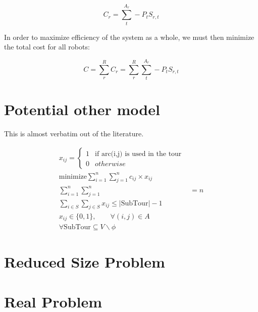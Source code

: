 \documentclass[a4paper]{article}
\begin{document}
$$C_r = \sum_t^{A_r} -P_t S_{r,t}$$

In order to maximize efficiency of the system as a whole, we must then minimize the total cost for all robots:

$$C = \sum_r^{R} C_r = \sum_r^{R} \sum_t^{A_r} -P_t S_{r,t}$$

\section{Potential other model}

This is almost verbatim out of the literature.

\begin{align}
x_{ij} = \begin{cases}
      1 & \text{if arc(i,j) is used in the tour} \\
      0 & otherwise
   \end{cases} \\
\text{minimize} \sum_{i=1}^n \sum_{j=1}^n c_{ij} \times x_{ij} \\
\sum_{i=1}^n \sum_{j=1}^n &= n \\
\sum_{i \in S} \sum_{j \in S} x_{ij} \le |\text{SubTour}| - 1 \\
x_{ij} \in \{0, 1\},\qquad \forall (i, j) \in A \\
\forall \text{SubTour} \subseteq V \backslash \phi
\end{align}


\section{Reduced Size Problem}


\section{Real Problem}

\end{document}
